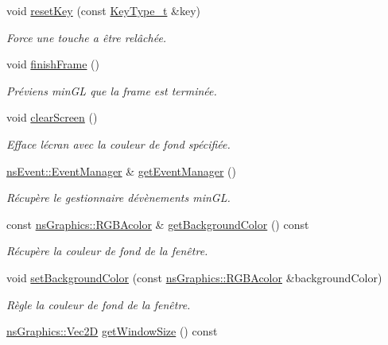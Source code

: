 \begin{DoxyCompactItemize}
void \hyperlink{class_min_g_l_a99750fd4c8f97cfe693b1acb903424cf}{reset\+Key} (const \hyperlink{class_min_g_l_a6e612d21ed9723c37ad91093f7b48c96}{Key\+Type\+\_\+t} \&key)
\begin{DoxyCompactList}\small\item\em Force une touche a être relâchée. \end{DoxyCompactList}\item 
void \hyperlink{class_min_g_l_a489922f0bdde2e38698adddaf57f6eda}{finish\+Frame} ()
\begin{DoxyCompactList}\small\item\em Préviens min\+GL que la frame est terminée. \end{DoxyCompactList}\item 
void \hyperlink{class_min_g_l_a86c940758616957683ffb2e239bba774}{clear\+Screen} ()
\begin{DoxyCompactList}\small\item\em Efface l\textquotesingle{}écran avec la couleur de fond spécifiée. \end{DoxyCompactList}\item 
\hyperlink{classns_event_1_1_event_manager}{ns\+Event\+::\+Event\+Manager} \& \hyperlink{class_min_g_l_ab558253439905930836ab4910a7ae253}{get\+Event\+Manager} ()
\begin{DoxyCompactList}\small\item\em Récupère le gestionnaire d\textquotesingle{}évènements min\+GL. \end{DoxyCompactList}\item 
const \hyperlink{classns_graphics_1_1_r_g_b_acolor}{ns\+Graphics\+::\+R\+G\+B\+Acolor} \& \hyperlink{class_min_g_l_a66758e8e6983cc1dd0b10b1ee743a65a}{get\+Background\+Color} () const
\begin{DoxyCompactList}\small\item\em Récupère la couleur de fond de la fenêtre. \end{DoxyCompactList}\item 
void \hyperlink{class_min_g_l_a4399b7615cea89f850cd5c66e428c367}{set\+Background\+Color} (const \hyperlink{classns_graphics_1_1_r_g_b_acolor}{ns\+Graphics\+::\+R\+G\+B\+Acolor} \&background\+Color)
\begin{DoxyCompactList}\small\item\em Règle la couleur de fond de la fenêtre. \end{DoxyCompactList}\item 
\hyperlink{classns_graphics_1_1_vec2_d}{ns\+Graphics\+::\+Vec2D} \hyperlink{class_min_g_l_a92bacd1567089fb4641ed7b416cfe74d}{get\+Window\+Size} () const

\end{DoxyCompactItemize}
